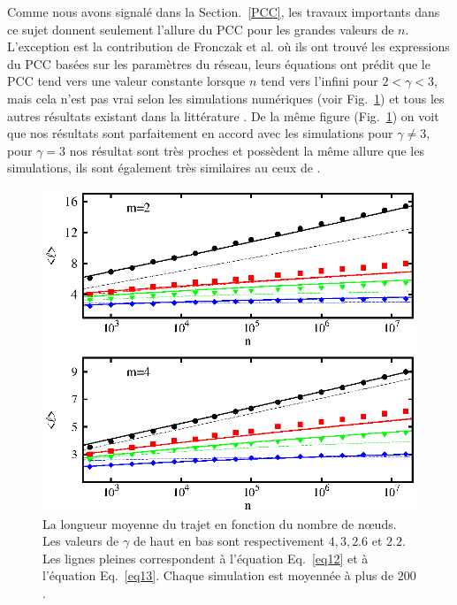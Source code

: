 Comme nous avons signalé dans la Section.~\ref{PCC}, les travaux importants \cite{Do-al2003,Cohen-Havlin2003} dans ce sujet donnent seulement l'allure du PCC pour les grandes valeurs de $n$. L'exception est la contribution de Fronczak et  al. \cite{Fronczak-al2004} où ils ont trouvé les expressions du PCC basées sur les paramètres du réseau, leurs équations ont prédit que le PCC tend vers une valeur constante lorsque $n$ tend vers l'infini pour $2<\gamma<3$, mais cela n’est pas vrai selon les simulations numériques (voir Fig.~\ref{fig4-3}) et tous les autres résultats existant dans la littérature \cite{Do-al2003,Cohen-al2002,Chung-Lu2002,Fox-Bellwood2014,Hofstad-al2014,Cohen-Havlin2003}. De la même figure (Fig.~\ref{fig4-3}) on voit que nos résultats sont parfaitement en accord avec les simulations pour $\gamma\neq3$, pour $\gamma=3$ nos résultat sont très proches et possèdent la même allure que les simulations, ils sont également très similaires au ceux de \cite{Fronczak-al2004}.
 \begin{figure}[h]
 	\centering
 	\includegraphics[scale=1.45]{./figures/fig4-3}
 	\caption{La longueur moyenne du trajet en fonction du nombre de nœuds. Les valeurs de $\gamma$ de haut en bas sont respectivement $ 4, 3, 2.6 $ et $ 2.2 $. Les lignes pleines correspondent à l'équation Eq.~\eqref{eq12} et à l'équation Eq.~\eqref{eq13}. Chaque simulation est moyennée à plus de $200 $.}
 	\label{fig4-3}
 \end{figure}
 
